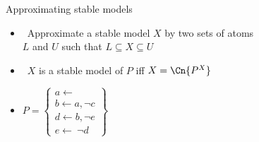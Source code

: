\begin{frame}{Approximating stable models}
  \medskip
  \begin{itemize}
  \item {} \ Approximate a stable model $X$ by two sets of atoms\\
    $L$ and $U$ such that
    \(
    L\subseteq X\subseteq U
    \)
    \smallskip
  \item {} \ $X$ is a stable model of $P$ iff $X=\Cn{P^X}$
    \smallskip
  \item {}
    \par\bigskip
    \(
    P
    =
    \left\{
      \begin{array}{l}
        a\leftarrow\\  b\leftarrow a,\neg c\\ d\leftarrow b,\neg e\\ e\leftarrow~\neg d
      \end{array}
    \right\}
    \)
  \end{itemize}
\end{frame}
%
